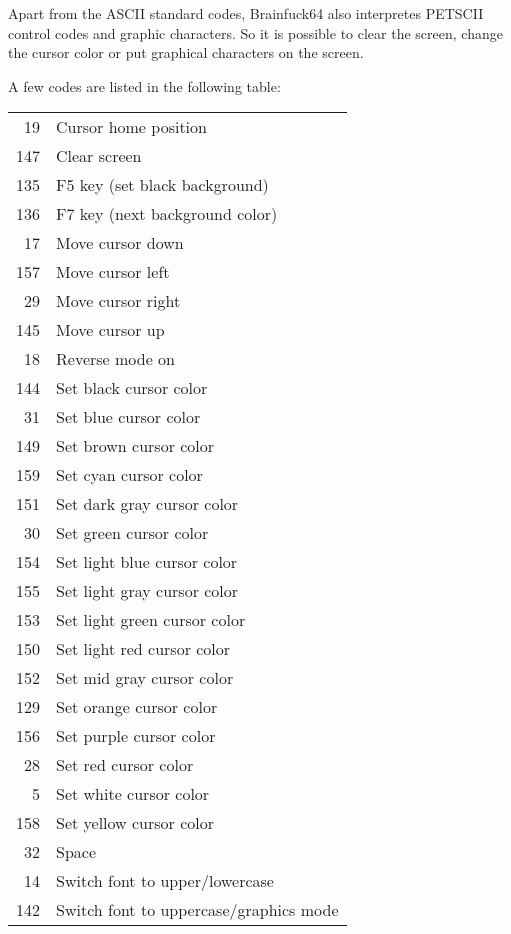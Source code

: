\documentclass[ms,article,a4paper]{memoir}
\begin{document}
Apart from the ASCII standard codes, Brainfuck64 also interpretes PETSCII control codes and graphic characters. So it is possible to clear the screen, change the cursor color or put graphical characters on the screen.

\begin{minipage}{\textwidth}
A few codes are listed in the following table:\\

\begin{tabular}{ r l }
  19  & Cursor home position \\
  147 & Clear screen \\  
  135 & F5 key (set black background) \\
  136 & F7 key (next background color) \\
  17  & Move cursor down \\    
  157 & Move cursor left \\  
  29  & Move cursor right \\
  145 & Move cursor up \\    
  18  & Reverse mode on \\
  144 & Set black cursor color \\  
  31  & Set blue cursor color \\
  149 & Set brown cursor color \\  
  159 & Set cyan cursor color \\  
  151 & Set dark gray cursor color \\
  30  & Set green cursor color \\
  154 & Set light blue cursor color \\  
  155 & Set light gray cursor color \\  
  153 & Set light green cursor color \\  
  150 & Set light red cursor color \\  
  152 & Set mid gray cursor color \\
  129 & Set orange cursor color \\
  156 & Set purple cursor color \\
  28  & Set red cursor color \\
  5   & Set white cursor color \\
  158 & Set yellow cursor color \\  
  32  & Space \\
  14  & Switch font to upper/lowercase\\
  142 & Switch font to uppercase/graphics mode\\
\end{tabular}
\end{minipage}
\end{document}
